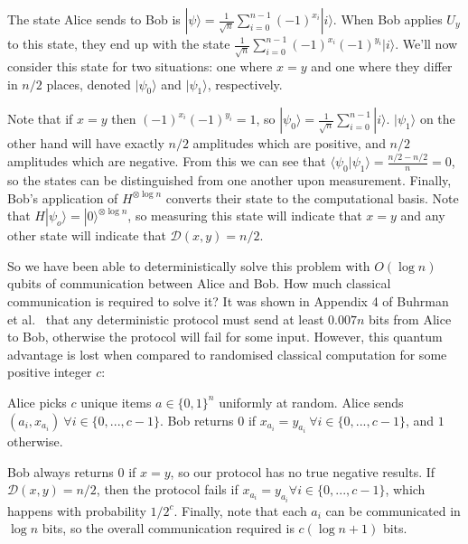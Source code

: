 \documentclass[a4paper]{article}
\begin{document}
        The state Alice sends to Bob is $|\psi\rangle = \frac{1}{\sqrt{n}}\sum_{i=0}^{n-1} (-1)^{x_i}|i\rangle$. When Bob applies $U_y$ to this state, they end up with the state $\frac{1}{\sqrt{n}}\sum_{i=0}^{n-1}(-1)^{x_i}(-1)^{y_i}|i\rangle$. We'll now consider this state for two situations: one where $x = y$ and one where they differ in $n/2$ places, denoted $|\psi_0\rangle$ and $|\psi_1\rangle$, respectively.

        Note that if $x = y$ then $(-1)^{x_i}(-1)^{y_i} = 1$, so $|\psi_0\rangle = \frac{1}{\sqrt{n}}\sum_{i = 0}^{n-1}|i\rangle$. $|\psi_1\rangle$ on the other hand will have exactly $n/2$ amplitudes which are positive, and $n/2$ amplitudes which are negative. From this we can see that $\langle\psi_0|\psi_1\rangle = \frac{n/2 - n/2}{n} = 0$, so the states can be distinguished from one another upon measurement. Finally, Bob's application of $H^{\otimes \log n}$ converts their state to the computational basis. Note that $H|\psi_o\rangle = |0\rangle^{\otimes\log n}$, so measuring this state will indicate that $x = y$ and any other state will indicate that $\mathcal{D}(x, y) = n/2$.

        So we have been able to deterministically solve this problem with $O(\log n)$ qubits of communication between Alice and Bob. How much classical communication is required to solve it? It was shown in Appendix 4 of Buhrman et al.~\cite{RevModPhys.82.665} that any deterministic protocol must send at least $0.007n$ bits from Alice to Bob, otherwise the protocol will fail for some input. However, this quantum advantage is lost when compared to randomised classical computation for some positive integer $c$:

        \begin{codebox}
            \li Alice picks $c$ unique items $a \in \{0, 1\}^n$ uniformly at random.
            \li Alice sends $(a_i, x_{a_i})~ \forall i \in \{0,...,c-1\}$.
            \li Bob returns $0$ if $x_{a_i} = y_{a_i}~ \forall i \in \{0,...,c-1\}$, and $1$ otherwise.
            \End
        \end{codebox}

        Bob always returns $0$ if $x = y$, so our protocol has no true negative results. If $\mathcal{D}(x, y) = n/2$, then the protocol fails if $x_{a_i} = y_{a_i} \forall i \in \{0,...,c-1\}$, which happens with probability $1/2^c$. Finally, note that each $a_i$ can be communicated in $\log n$ bits, so the overall communication required is $c(\log n + 1)$ bits.
\end{document}
